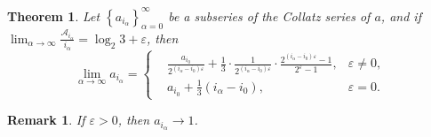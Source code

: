 \documentclass[a4paper,12pt]{article}
\theoremstyle{sltheorem}
\newtheorem{theorem}{Theorem}
\newtheorem*{remark}{Remark}
\begin{document}
\begin{theorem}
    Let $\left\{a_{i_\alpha}\right\}_{\alpha=0}^{\infty}$ be a subseries of the Collatz series of $a$, and if \newline 
    $\lim_{\alpha\to \infty}\frac{\mathcal{A}_{i_\alpha}}{i_\alpha} = \log_{2}3 + \varepsilon$, then
    \[\lim_{\alpha\to\infty}a_{i_\alpha} = \left\{\begin{aligned}
        &\frac{a_{i_0}}{2^{(i_{\alpha} - i_0)\varepsilon}} + \frac{1}{3}\cdot\frac{1}{2^{(i_{\alpha} - i_0)\varepsilon}}\cdot\frac{2^{(i_{\alpha} - i_0)\varepsilon} - 1}{2^{\varepsilon}  - 1}, & \varepsilon \ne 0, \\
        &a_{i_0} + \frac{1}{3}(i_{\alpha} - i_0), & \varepsilon = 0.
    \end{aligned}\right. \]
\end{theorem}
\begin{remark}
    If $\varepsilon > 0$, then $a_{i_\alpha} \to 1$.
\end{remark}
\end{document}
